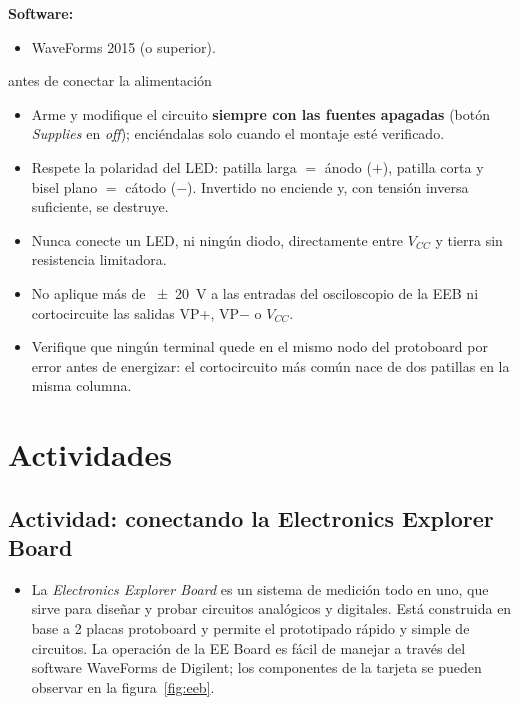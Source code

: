 \documentclass[11pt,a4paper]{article}
\begin{document}
\noindent\textbf{Software:}
\begin{itemize}
    \item WaveForms 2015 (o superior).
\end{itemize}

\begin{seguridad}{antes de conectar la alimentación}
\begin{itemize}
    \item Arme y modifique el circuito \textbf{siempre con las fuentes apagadas}
          (botón \emph{Supplies} en \emph{off}); enciéndalas solo cuando el montaje esté
          verificado.
    \item Respete la polaridad del LED: patilla larga $=$ ánodo ($+$), patilla corta y bisel
          plano $=$ cátodo ($-$). Invertido no enciende y, con tensión inversa suficiente,
          se destruye.
    \item Nunca conecte un LED, ni ningún diodo, directamente entre $V_{CC}$ y tierra sin
          resistencia limitadora.
    \item No aplique más de \qty{\pm 20}{\volt} a las entradas del osciloscopio de la EEB
          ni cortocircuite las salidas VP+, VP$-$ o $V_{CC}$.
    \item Verifique que ningún terminal quede en el mismo nodo del protoboard por error antes
          de energizar: el cortocircuito más común nace de dos patillas en la misma columna.
\end{itemize}
\end{seguridad}

\FloatBarrier
\section{Actividades}
\subsection{Actividad: conectando la Electronics Explorer Board}

\begin{itemize}
\item La \emph{Electronics Explorer Board} es un sistema de medición todo en uno, que sirve para
diseñar y probar circuitos analógicos y digitales. Está construida en base a 2 placas protoboard
y permite el prototipado rápido y simple de circuitos. La operación de la EE Board es fácil de
manejar a través del software WaveForms de Digilent; los componentes de la tarjeta se pueden
observar en la figura~\ref{fig:eeb}.
\end{itemize}
\end{document}

